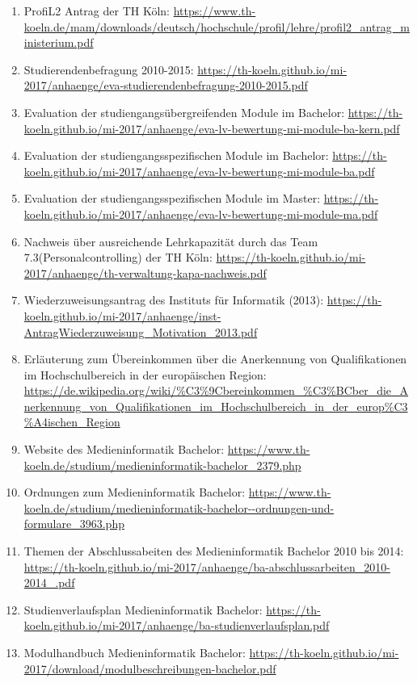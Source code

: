 \documentclass[BCOR12mm,DIV11,titlepage,a4paper,oneside,10pt]{scrbook}
\begin{document}
\begin{sloppypar}
\begin{flushleft}
\begin{enumerate}
\item{ProfiL2 Antrag der TH Köln: \url{https://www.th-koeln.de/mam/downloads/deutsch/hochschule/profil/lehre/profil2\_antrag\_ministerium.pdf} } 
\item{Studierendenbefragung 2010-2015: \url{https://th-koeln.github.io/mi-2017/anhaenge/eva-studierendenbefragung-2010-2015.pdf} } 
\item{Evaluation der studiengangsübergreifenden Module im Bachelor: \url{https://th-koeln.github.io/mi-2017/anhaenge/eva-lv-bewertung-mi-module-ba-kern.pdf} } 
\item{Evaluation der studiengangsspezifischen Module im Bachelor: \url{https://th-koeln.github.io/mi-2017/anhaenge/eva-lv-bewertung-mi-module-ba.pdf} } 
\item{Evaluation der studiengangsspezifischen Module im Master: \url{https://th-koeln.github.io/mi-2017/anhaenge/eva-lv-bewertung-mi-module-ma.pdf} } 
\item{Nachweis über ausreichende Lehrkapazität durch das Team 7.3(Personalcontrolling) der TH Köln: \url{https://th-koeln.github.io/mi-2017/anhaenge/th-verwaltung-kapa-nachweis.pdf} } 
\item{Wiederzuweisungsantrag des Instituts für Informatik (2013): \url{https://th-koeln.github.io/mi-2017/anhaenge/inst-AntragWiederzuweisung\_Motivation\_2013.pdf} } 
\item{Erläuterung zum Übereinkommen über die Anerkennung von Qualifikationen im Hochschulbereich in der europäischen Region: \url{https://de.wikipedia.org/wiki/\%C3\%9Cbereinkommen\_\%C3\%BCber\_die\_Anerkennung\_von\_Qualifikationen\_im\_Hochschulbereich\_in\_der\_europ\%C3\%A4ischen\_Region} } 
\item{Website des Medieninformatik Bachelor: \url{https://www.th-koeln.de/studium/medieninformatik-bachelor\_2379.php} } 
\item{Ordnungen zum Medieninformatik Bachelor: \url{https://www.th-koeln.de/studium/medieninformatik-bachelor--ordnungen-und-formulare\_3963.php} } 
\item{Themen der Abschlussabeiten des Medieninformatik Bachelor 2010 bis 2014: \url{https://th-koeln.github.io/mi-2017/anhaenge/ba-abschlussarbeiten\_2010-2014\_.pdf} } 
\item{Studienverlaufsplan Medieninformatik Bachelor: \url{https://th-koeln.github.io/mi-2017/anhaenge/ba-studienverlaufsplan.pdf} } 
\item{Modulhandbuch Medieninformatik Bachelor: \url{https://th-koeln.github.io/mi-2017/download/modulbeschreibungen-bachelor.pdf} } 

\end{enumerate}
\end{flushleft}
\end{sloppypar}
\end{document}
